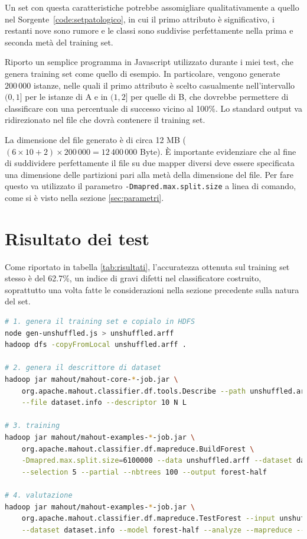 \documentclass[a4paper,11pt,twoside,openright,fleqn]{book}
\renewcommand{\lstlistingname}{Sorgente}
\newcommand{\code}[1]{\texttt{#1}}
\begin{document}
Un set con questa caratteristiche potrebbe assomigliare qualitativamente a quello nel \lstlistingname\ \ref{code:setpatologico}, in cui il primo attributo è significativo, i restanti nove sono rumore e le classi sono suddivise perfettamente nella prima e seconda metà del training set.



Riporto un semplice programma in Javascript utilizzato durante i miei test, che genera training set come quello di esempio. In particolare, vengono generate $200\, 000$ istanze, nelle quali il primo attributo è scelto casualmente nell'intervallo $(0,1]$ per le istanze di A e in $(1,2]$ per quelle di B, che dovrebbe permettere di classificare con una percentuale di successo vicino al 100\%. Lo standard output va ridirezionato nel file che dovrà contenere il training set.



La dimensione del file generato è di circa 12 MB ($(6 \times 10 + 2) \times 200\, 000 = 12\, 400\, 000$ Byte). È importante evidenziare che al fine di suddividere perfettamente il file su due mapper diversi deve essere specificata una dimensione delle partizioni pari alla metà della dimensione del file. Per fare questo va utilizzato il parametro \code{-Dmapred.max.split.size} a linea di comando, come si è visto nella sezione \ref{sec:parametri}.

\section{Risultato dei test}

Come riportato in tabella \ref{tab:risultati}, l'accuratezza ottenuta sul training set stesso è del 62.7\%, un indice di gravi difetti nel classificatore costruito, soprattutto una volta fatte le considerazioni nella sezione precedente sulla natura del set.

\begin{lstlisting}[float=htbp,language=bash,label=code:test-half,caption=Lancio del primo test]
# 1. genera il training set e copialo in HDFS
node gen-unshuffled.js > unshuffled.arff
hadoop dfs -copyFromLocal unshuffled.arff .

# 2. genera il descrittore di dataset
hadoop jar mahout/mahout-core-*-job.jar \
	org.apache.mahout.classifier.df.tools.Describe --path unshuffled.arff \
	--file dataset.info --descriptor 10 N L

# 3. training
hadoop jar mahout/mahout-examples-*-job.jar \
	org.apache.mahout.classifier.df.mapreduce.BuildForest \
	-Dmapred.max.split.size=6100000 --data unshuffled.arff --dataset dataset.info \
	--selection 5 --partial --nbtrees 100 --output forest-half

# 4. valutazione
hadoop jar mahout/mahout-examples-*-job.jar \
	org.apache.mahout.classifier.df.mapreduce.TestForest --input unshuffled.arff \
	--dataset dataset.info --model forest-half --analyze --mapreduce --output predictions-half
\end{lstlisting}
\end{document}
